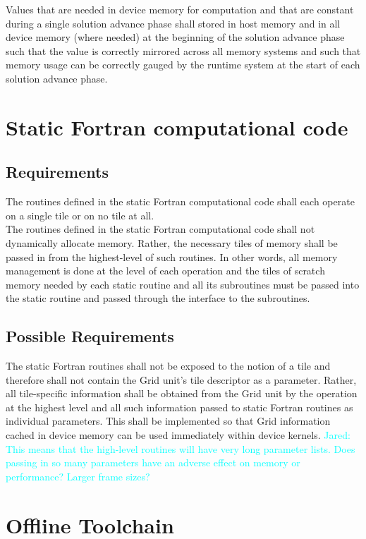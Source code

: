 \documentclass{article}
\newcommand{\Jared}[1]          {\textcolor{cyan}{Jared: #1}}
\begin{document}
Values that are needed in device memory for computation and that are constant
during a single solution advance phase shall stored in host memory and in all device memory
(where needed) at the beginning of the solution advance phase such that the value is
correctly mirrored across all memory systems and such that memory usage can be
correctly gauged by the runtime system at the start of each solution advance phase.

\section{Static Fortran computational code}
\subsection{Requirements}
The routines defined in the static Fortran computational code shall each operate
on a single tile or on no tile at all.\\

The routines defined in the static Fortran computational code shall not
dynamically allocate memory.  Rather, the necessary tiles of memory shall be
passed in from the highest-level of such routines.  In other words, all memory
management is done at the level of each operation and the tiles of scratch
memory needed by each static routine and all its subroutines must be passed into
the static routine and passed through the interface to the subroutines.

\subsection{Possible Requirements}
The static Fortran routines shall not be exposed to the notion of a tile and
therefore shall not contain the Grid unit's tile descriptor as a parameter.
Rather, all tile-specific information shall be obtained from the Grid unit by
the operation at the highest level and all such information passed to static
Fortran routines as individual parameters.  This shall be implemented so that
Grid information cached in device memory can be used immediately within device
kernels.  \Jared{This means that the high-level routines will have very
long parameter lists.  Does passing in so many parameters have an adverse effect
on memory or performance?  Larger frame sizes?}

\section{Offline Toolchain}
\end{document}
